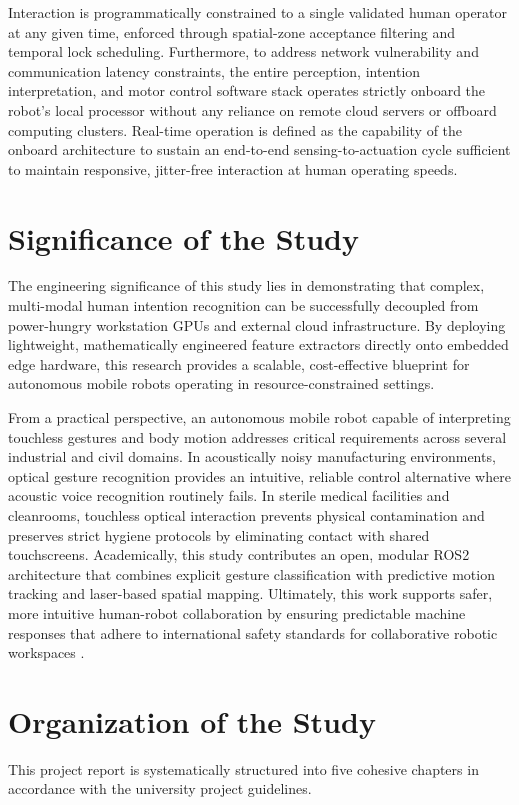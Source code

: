Interaction is programmatically constrained to a single validated human operator at any given time, enforced through spatial-zone acceptance filtering and temporal lock scheduling. Furthermore, to address network vulnerability and communication latency constraints, the entire perception, intention interpretation, and motor control software stack operates strictly onboard the robot's local processor without any reliance on remote cloud servers or offboard computing clusters. Real-time operation is defined as the capability of the onboard architecture to sustain an end-to-end sensing-to-actuation cycle sufficient to maintain responsive, jitter-free interaction at human operating speeds.

\section{Significance of the Study}
The engineering significance of this study lies in demonstrating that complex, multi-modal human intention recognition can be successfully decoupled from power-hungry workstation GPUs and external cloud infrastructure. By deploying lightweight, mathematically engineered feature extractors directly onto embedded edge hardware, this research provides a scalable, cost-effective blueprint for autonomous mobile robots operating in resource-constrained settings.

From a practical perspective, an autonomous mobile robot capable of interpreting touchless gestures and body motion addresses critical requirements across several industrial and civil domains. In acoustically noisy manufacturing environments, optical gesture recognition provides an intuitive, reliable control alternative where acoustic voice recognition routinely fails. In sterile medical facilities and cleanrooms, touchless optical interaction prevents physical contamination and preserves strict hygiene protocols by eliminating contact with shared touchscreens. Academically, this study contributes an open, modular ROS2 architecture that combines explicit gesture classification with predictive motion tracking and laser-based spatial mapping. Ultimately, this work supports safer, more intuitive human-robot collaboration by ensuring predictable machine responses that adhere to international safety standards for collaborative robotic workspaces \cite{iso150662016}.

\section{Organization of the Study}
This project report is systematically structured into five cohesive chapters in accordance with the university project guidelines. 

